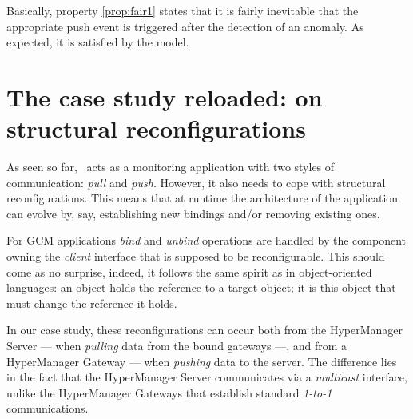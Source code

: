 		
		\noindent Basically, property \ref{prop:fair1} states that it is fairly inevitable that
		the appropriate push event is triggered after the detection of an anomaly.
		As expected, it is satisfied by the model.
		
		
		
       
        
        

\section{The case study reloaded: on structural reconfigurations}
\label{sec:reconfig}


	As seen so far, \thehm\ acts as a monitoring application with two styles of
	communication: \textit{pull} and \textit{push}. However, it also needs to cope with structural 
	reconfigurations. This means that at runtime the architecture of the application can evolve
	by, say, establishing new bindings and/or removing existing ones.
		
	For \ac{GCM} applications \textit{bind} and \textit{unbind} operations are handled by the component
	owning the \textit{client} interface that is supposed to be reconfigurable. This should come
	as no surprise, indeed, it follows the same spirit as in object-oriented languages: an object
	holds the reference to a target object; it is this object that must change the reference it holds.
	
	In our case study, these reconfigurations can occur both from the \textsf{HyperManager Server} 
	 --- when \textit{pulling} data from the bound gateways ---, and from a \textsf{HyperManager Gateway}
	 --- when \textit{pushing} data to the server.
	The difference lies in the fact that the \textsf{HyperManager Server} communicates via a \textit{multicast} interface, 
	unlike the \textsf{HyperManager Gateway}s that establish standard \textit{1-to-1} 
	communications. %
	
